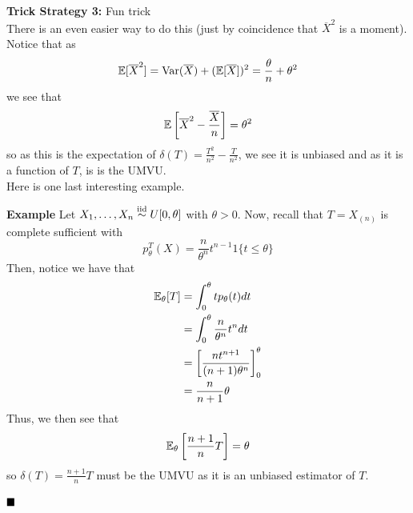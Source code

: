 \textbf{Trick Strategy 3:} Fun trick\\

There is an even easier way to do this (just by coincidence that $\overline{X}^2$ is a moment). Notice that as 
\[ \mathbb{E}[\overline{X}^2] = \text{Var}(\overline{X}) + (\mathbb{E}[\overline{X}])^2 = \frac{\theta}{n} + \theta^2 \]
we see that
\[ \mathbb{E}\left[\overline{X}^2 - \frac{\overline{X}}{n}\right] = \theta^2 \]
so as this is the expectation of $\delta(T) = \frac{T^2}{n^2} - \frac{T}{n^2}$, we see it is unbiased and as it is a function of $T$, is is the UMVU. \\

Here is one last interesting example.

\begin{example}{\textbf{Example}}
    Let $X_1, \ldots, X_n \overset{\text{iid}}{\sim} U[0, \theta]$ with $\theta > 0$. Now, recall that $T = X_{(n)}$ is complete sufficient with
    \[ p_{\theta}^{T}(X) = \frac{n}{\theta^{n}}t^{n - 1}1\{t \leq \theta\} \]
    Then, notice we have that
    \begin{align*}
        \mathbb{E}_{\theta}[T] &= \int_{0}^{\theta} tp_{\theta}(t) dt\\
        &= \int_{0}^{\theta} \frac{n}{\theta^{n}}t^{n}dt\\
        &= \left[\frac{nt^{n + 1}}{(n + 1)\theta^{n}}\right]_{0}^{\theta}\\
        &= \frac{n}{n + 1}\theta
    \end{align*}
    Thus, we then see that
    \[ \mathbb{E}_{\theta}\left[\frac{n + 1}{n}T\right] = \theta \]
    so $\delta(T) = \frac{n + 1}{n}T$ must be the UMVU as it is an unbiased estimator of $T$.

    $\qed$
\end{example}




